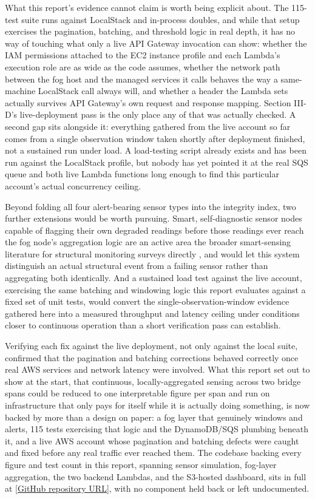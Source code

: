 \documentclass[conference]{IEEEtran}
\begin{document}
What this report's evidence cannot claim is worth being explicit about. The 115-test suite runs against LocalStack and in-process doubles, and while that setup exercises the pagination, batching, and threshold logic in real depth, it has no way of touching what only a live API Gateway invocation can show: whether the IAM permissions attached to the EC2 instance profile and each Lambda's execution role are as wide as the code assumes, whether the network path between the fog host and the managed services it calls behaves the way a same-machine LocalStack call always will, and whether a header the Lambda sets actually survives API Gateway's own request and response mapping. Section III-D's live-deployment pass is the only place any of that was actually checked. A second gap sits alongside it: everything gathered from the live account so far comes from a single observation window taken shortly after deployment finished, not a sustained run under load. A load-testing script already exists and has been run against the LocalStack profile, but nobody has yet pointed it at the real SQS queue and both live Lambda functions long enough to find this particular account's actual concurrency ceiling.

Beyond folding all four alert-bearing sensor types into the integrity index, two further extensions would be worth pursuing. Smart, self-diagnostic sensor nodes capable of flagging their own degraded readings before those readings ever reach the fog node's aggregation logic are an active area the broader smart-sensing literature for structural monitoring surveys directly \cite{ref12}, and would let this system distinguish an actual structural event from a failing sensor rather than aggregating both identically. And a sustained load test against the live account, exercising the same batching and windowing logic this report evaluates against a fixed set of unit tests, would convert the single-observation-window evidence gathered here into a measured throughput and latency ceiling under conditions closer to continuous operation than a short verification pass can establish.

Verifying each fix against the live deployment, not only against the local suite, confirmed that the pagination and batching corrections behaved correctly once real AWS services and network latency were involved. What this report set out to show at the start, that continuous, locally-aggregated sensing across two bridge spans could be reduced to one interpretable figure per span and run on infrastructure that only pays for itself while it is actually doing something, is now backed by more than a design on paper: a fog layer that genuinely windows and alerts, 115 tests exercising that logic and the DynamoDB/SQS plumbing beneath it, and a live AWS account whose pagination and batching defects were caught and fixed before any real traffic ever reached them. The codebase backing every figure and test count in this report, spanning sensor simulation, fog-layer aggregation, the two backend Lambdas, and the S3-hosted dashboard, sits in full at \href{[GitHub repository URL]}{[GitHub repository URL]}, with no component held back or left undocumented.



\end{document}
